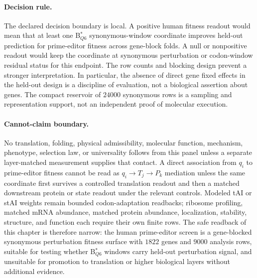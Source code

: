 \paragraph{Decision rule.}
The declared decision boundary is local. A positive human fitness readout would mean that at least one B$^*_{Q6}$ synonymous-window coordinate improves held-out prediction for prime-editor fitness across gene-block folds. A null or nonpositive readout would keep the coordinate at synonymous perturbation or codon-window residual status for this endpoint. The row counts and blocking design prevent a stronger interpretation. In particular, the absence of direct gene fixed effects in the held-out design is a discipline of evaluation, not a biological assertion about genes. The compact reservoir of $24000$ synonymous rows is a sampling and representation support, not an independent proof of molecular execution.

\paragraph{Cannot-claim boundary.}
No translation, folding, physical admissibility, molecular function, mechanism, phenotype, selection law, or universality follows from this panel unless a separate layer-matched measurement supplies that contact. A direct association from $q_i$ to prime-editor fitness cannot be read as $q_i \to T_j \to P_k$ mediation unless the same coordinate first survives a controlled translation readout and then a matched downstream protein or state readout under the relevant controls. Modeled tAI or stAI weights remain bounded codon-adaptation readbacks; ribosome profiling, matched mRNA abundance, matched protein abundance, localization, stability, structure, and function each require their own finite rows. The safe readback of this chapter is therefore narrow: the human prime-editor screen is a gene-blocked synonymous perturbation fitness surface with $1822$ genes and $9000$ analysis rows, suitable for testing whether B$^*_{Q6}$ windows carry held-out perturbation signal, and unsuitable for promotion to translation or higher biological layers without additional evidence.